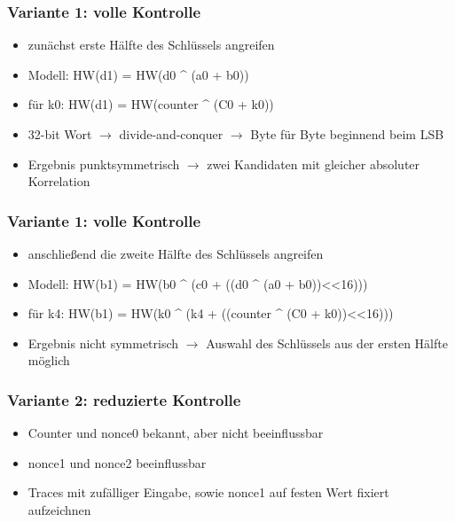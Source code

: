 \documentclass[ngerman]{beamer}
\begin{document}
\begin{frame}

    \frametitle{Variante 1: volle Kontrolle}


    \begin{itemize}
        \item zunächst erste Hälfte des Schlüssels angreifen
        \item Modell: HW(d1) = HW(d0 \^{} (a0 + b0))
        \item für k0: HW(d1) = HW(counter \^{} (C0 + k0))
        \item 32-bit Wort $\rightarrow$ divide-and-conquer $\rightarrow$ Byte
            für Byte beginnend beim LSB
        \item Ergebnis punktsymmetrisch $\rightarrow$ zwei Kandidaten mit
            gleicher absoluter Korrelation
    \end{itemize}

\end{frame}



\begin{frame}

    \frametitle{Variante 1: volle Kontrolle}


    \begin{itemize}
        \item anschließend die zweite Hälfte des Schlüssels angreifen
        \item Modell: HW(b1) = HW(b0 \^{} (c0 + ((d0 \^{} (a0 + b0))<<16)))
        \item für k4: HW(b1) = HW(k0 \^{} (k4 + ((counter \^{} (C0 + k0))<<16)))
        \item Ergebnis nicht symmetrisch $\rightarrow$ Auswahl des Schlüssels
            aus der ersten Hälfte möglich
    \end{itemize}

\end{frame}



\begin{frame}

    \frametitle{Variante 2: reduzierte Kontrolle}


    \begin{itemize}
        \item Counter und nonce0 bekannt, aber nicht beeinflussbar
        \item nonce1 und nonce2 beeinflussbar
        \item Traces mit zufälliger Eingabe, sowie nonce1 auf festen Wert
            fixiert aufzeichnen
    \end{itemize}

\end{frame}
\end{document}
